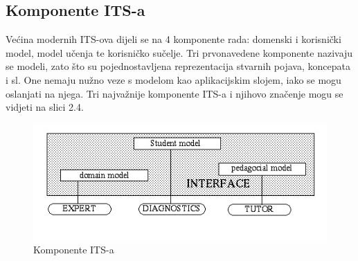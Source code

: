 \documentclass[times, utf8, zavrsni, numeric]{fer}
\begin{document}
\subsection{Komponente ITS-a}
Većina modernih ITS-ova dijeli se na 4 komponente rada: domenski i korisnički model, model učenja te korisničko sučelje. Tri prvonavedene komponente nazivaju se modeli, zato što su pojednostavljena reprezentacija stvarnih pojava, koncepata i sl.\citep{aect} One nemaju nužno veze s modelom kao aplikacijskim slojem, iako se mogu oslanjati na njega. Tri najvažnije komponente ITS-a i njihovo značenje mogu se vidjeti na slici 2.4.

\begin{figure}[htb]
\centering
\includegraphics[]{img/ITS-components.jpg}
\caption{Komponente ITS-a\citep{itscomponents}}
\label{fig:its-comp}
\end{figure}
\end{document}
